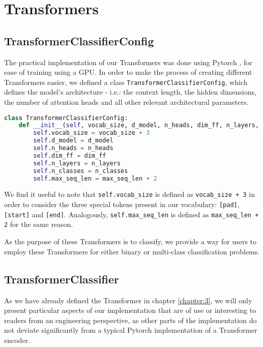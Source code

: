 \section{Transformers}
\subsection{TransformerClassifierConfig}
The practical implementation of our Transformers was done using Pytorch \cite{pytorch}, for ease of training using a GPU. 
In order to make the process of creating different Transformers easier, we defined a class \verb|TransformerClassifierConfig|, which defines the model's architecture - i.e.: the context length, the hidden dimensions, the number of attention heads and all other relevant architectural parameters.

\begin{lstlisting}[language=Python, caption=TransformerClassifierConfig definition, label=code:classifier_config]
class TransformerClassifierConfig:
    def __init__(self, vocab_size, d_model, n_heads, dim_ff, n_layers, n_classes, max_seq_len):
        self.vocab_size = vocab_size + 3
        self.d_model = d_model
        self.n_heads = n_heads
        self.dim_ff = dim_ff
        self.n_layers = n_layers
        self.n_classes = n_classes
        self.max_seq_len = max_seq_len + 2
\end{lstlisting}

We find it useful to note that \verb|self.vocab_size| is defined as \verb|vocab_size + 3| in order to consider the three special tokens present in our vocabulary: \verb|[pad]|, \verb|[start]| and \verb|[end]|. Analogously, \verb|self.max_seq_len| is defined as \verb|max_seq_len + 2| for the same reason.

As the purpose of these Transformers is to classify, we provide a way for users to employ these Transformers for either binary or multi-class classification problems.

\subsection{TransformerClassifier}

As we have already defined the Transformer in chapter \ref{chapter:3}, we will only present particular aspects of our implementation that are of use or interesting to readers from an engineering perspective, as other parts of the implementation do not deviate significantly from a typical Pytorch implementation of a Transformer encoder.

